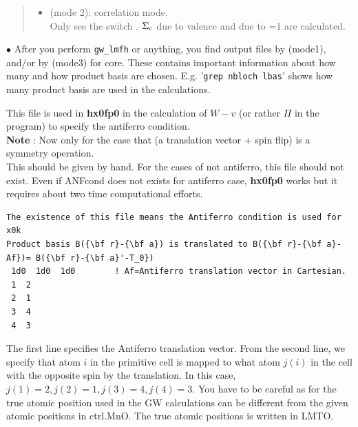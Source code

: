 {\begin{quote}
\begin{itemize}
\item 
{} (mode 2): correlation mode.\\
Only see the switch .
$\Sigma_{\rm c}$ due to valence and due to =1 are calculated.

\end{itemize}

\end{quote}

\noindent $\bullet$ After you perform \verb#gw_lmfh# or anything,
you find output files  by  (mode1), and/or 
by  (mode3) for core. These contains important information
about how many and how product basis are chosen. 
E.g. '\verb#grep nbloch lbas#' shows how many product basis are used in the calculations.



 
This file is used in {\bf hx0fp0} in the calculation of $W-v$ 
(or rather $\Pi$ in the program) to specify the antiferro condition.\\

{\bf Note} : Now only for the case that 
(a translation vector + spin flip) is a symmetry operation.\\

This should be given by hand. For the cases of not antiferro,
this file should not exist. Even if {\sf ANFcond } 
does not exists for antiferro case, {\bf hx0fp0} works but it 
requires about two time computational efforts.

{\baselineskip=2.6mm \small
\begin{verbatim} 
The existence of this file means the Antiferro condition is used for x0k
Product basis B({\bf r}-{\bf a}) is translated to B({\bf r}-{\bf a}-Af})= B({\bf r}-{\bf a}'-T_0})
 1d0  1d0  1d0        ! Af=Antiferro translation vector in Cartesian.
 1  2
 2  1
 3  4
 4  3
\end{verbatim}}
The first line specifies the Antiferro translation vector.
From the second line, we specify that atom $i$ in the primitive cell
is mapped to what atom $j(i)$ in the cell with the opposite spin by
the translation. In this case, $j(1)=2, j(2)=1,j(3)=4, j(4)=3$.
You have to be careful as for the true atomic position used in 
the GW calculations can be different from the given atomic positions in
{\sf ctrl.MnO}. The true atomic positions is written in {\sf LMTO}.


}
